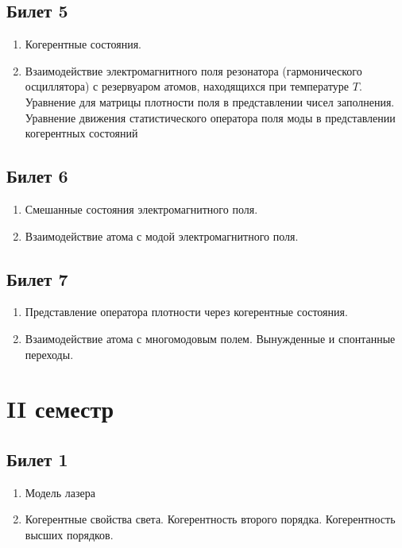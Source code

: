\subsection*{Билет 5} 
\begin{enumerate}
\item Когерентные состояния. 
\item Взаимодействие электромагнитного поля резонатора
  (гармонического осциллятора) с резервуаром атомов, находящихся при
  температуре $T$. Уравнение для матрицы плотности поля в представлении чисел
  заполнения. Уравнение движения статистического оператора поля моды в
  представлении когерентных состояний
\end{enumerate}

\subsection*{Билет 6} 
\begin{enumerate}
\item Смешанные состояния электромагнитного поля. 
\item Взаимодействие
атома с модой электромагнитного поля. 
\end{enumerate}

\subsection*{Билет 7} 
\begin{enumerate}
\item Представление оператора плотности через когерентные
  состояния.
\item Взаимодействие атома с многомодовым полем. Вынужденные и
  спонтанные переходы.
\end{enumerate}

\section*{II семестр}

\subsection*{Билет 1} 
\begin{enumerate}
\item Модель лазера
\item Когерентные свойства света.
 Когерентность второго порядка.
 Когерентность высших порядков.
\end{enumerate}

